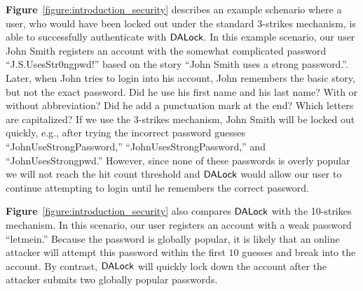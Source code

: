 
 \textbf{Figure}~\ref{figure:introduction_security} {describes an example schenario where a user, who would have been locked out under the standard 3-strikes mechanism, is able to successfully authenticate with $\mathsf{DALock}$}. In this example scenario, our user John Smith registers an account with the somewhat complicated password ``J.S.UsesStr0ngpwd!'' based on the story ``John Smith uses a strong password.''. Later, when John tries to login into his account, John remembers the basic story, but not the exact password. Did he use his first name and his last name? With or without abbreviation? Did he add a punctuation mark at the end? Which letters are capitalized? If we use the 3-strikes mechanism, John Smith will be locked out quickly, e.g., after trying the incorrect password guesses ``JohnUseStrongPassword,'' ``JohnUsesStrongPassword,'' and ``JohnUsesStrongpwd.'' However, since none of these passwords is overly popular {we will not reach the hit count threshold and} $\mathsf{DALock}$ would allow our user to continue attempting to login until he remembers the correct password. 



 \textbf{Figure}~\ref{figure:introduction_security}  {also} compares $\mathsf{DALock}$ with the 10-strikes mechanism. In this scenario, our user registers an account with a weak password ``letmein.'' Because the password is globally popular, it is likely that an online attacker will attempt this password within the first $10$ guesses and break into the account. By contrast, $\mathsf{DALock}$ will quickly lock down the account after the attacker submits two globally popular passwords. 

